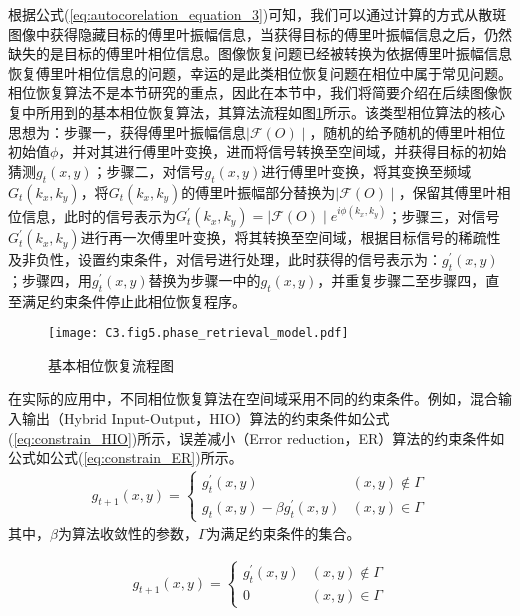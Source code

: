 根据公式(\ref{eq:autocorelation_equation_3})可知，我们可以通过计算的方式从散斑图像中获得隐藏目标的傅里叶振幅信息，当获得目标的傅里叶振幅信息之后，仍然缺失的是目标的傅里叶相位信息。图像恢复问题已经被转换为依据傅里叶振幅信息恢复傅里叶相位信息的问题，幸运的是此类相位恢复问题在相位中属于常见问题。相位恢复算法不是本节研究的重点，因此在本节中，我们将简要介绍在后续图像恢复中所用到的基本相位恢复算法，其算法流程如图\ref{fig:3.5}所示。该类型相位算法的核心思想为：步骤一，获得傅里叶振幅信息$\mid \mathcal{F}(O) \mid$，随机的给予随机的傅里叶相位初始值$\phi$，并对其进行傅里叶变换，进而将信号转换至空间域，并获得目标的初始猜测$g_t(x,y)$；步骤二，对信号$g_t(x,y)$进行傅里叶变换，将其变换至频域$G_t(k_x,k_y)$，将$G_t(k_x,k_y)$的傅里叶振幅部分替换为$\mid \mathcal{F}(O) \mid$，保留其傅里叶相位信息，此时的信号表示为$G^{\prime}_t(k_x,k_y) =\mid \mathcal{F}(O) \mid e^{i\phi (k_x,k_y)}$；步骤三，对信号$G^{\prime}_t(k_x,k_y)$进行再一次傅里叶变换，将其转换至空间域，根据目标信号的稀疏性及非负性，设置约束条件，对信号进行处理，此时获得的信号表示为：$g^{\prime}_t(x,y)$；步骤四，用$g^{\prime}_t(x,y)$替换为步骤一中的$g_t(x,y)$，并重复步骤二至步骤四，直至满足约束条件停止此相位恢复程序。

\begin{figure}[htp]
	\centering
	\texttt{[image: C3.fig5.phase\_retrieval\_model.pdf]}
	\caption{基本相位恢复流程图}
	\label{fig:3.5}
\end{figure}
在实际的应用中，不同相位恢复算法在空间域采用不同的约束条件。例如，混合输入输出（Hybrid Input-Output，HIO）算法的约束条件如公式(\ref{eq:constrain_HIO})所示，误差减小（Error reduction，ER）算法的约束条件如公式如公式(\ref{eq:constrain_ER})所示。
\begin{equation}
\begin{aligned}
 g_{t+1}(x,y) =
		  \begin{cases}
		    g_{t}^{\prime}(x,y)   &   (x,y)\notin\Gamma\\
		    g_{t}(x,y)-\beta g_{t}^{\prime}(x,y) & (x,y)\in\Gamma
		  \end{cases}
\end{aligned}
\label{eq:constrain_ER}
\end{equation}
其中，$\beta$为算法收敛性的参数，$\Gamma$为满足约束条件的集合。

\begin{equation}
\begin{aligned}
 g_{t+1}(x,y) =
		  \begin{cases}
		    g_{t}^{\prime}(x,y)   &   (x,y)\notin\Gamma\\
		    0  & (x,y)\in\Gamma
		  \end{cases}
\end{aligned}
\label{eq:constrain_HIO}
\end{equation}


